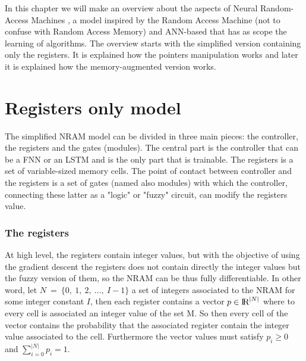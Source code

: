 In this chapter we will make an overview about the aspects of Neural Random-Access Machines \cite{NRAM:2016}, a model inspired by the Random Access Machine (not to confuse with Random Access Memory) and ANN-based that has as scope the learning of algorithms. The overview starts with the simplified version containing only the registers. It is explained how the pointers manipulation works and later it is explained how the memory-augmented version works.

\section{Registers only model}
The simplified NRAM model can be divided in three main pieces: the controller, the registers and the gates (modules). The central part is the controller that can be a FNN or an LSTM and is the only part that is trainable. The registers is a set of variable-sized memory cells. The point of contact between controller and the registers is a set of gates (named also modules) with which the controller, connecting these latter as a "logic" or "fuzzy" circuit, can modify the registers value. 

\subsubsection*{The registers}
At high level, the registers contain integer values, but with the objective of using the gradient descent the registers does not contain directly the integer values but the fuzzy version of them, so the NRAM can be thus fully differentiable. In other word, let $N\ =\ \{0,\ 1,\ 2,\ \dots,\ I - 1\}$ a set of integers associated to the NRAM for some integer constant $I$, then each register contains a vector $p \in \textrm{I\!R}^{|N|}$ where to every cell is associated an integer value of the set M. So then every cell of the vector contains the probability that the associated register contain the integer value associated to the cell. Furthermore the vector values must satisfy $p_{i} \geq 0$ and $\sum\limits_{i = 0}^{|N|} p_{i} = 1$.

